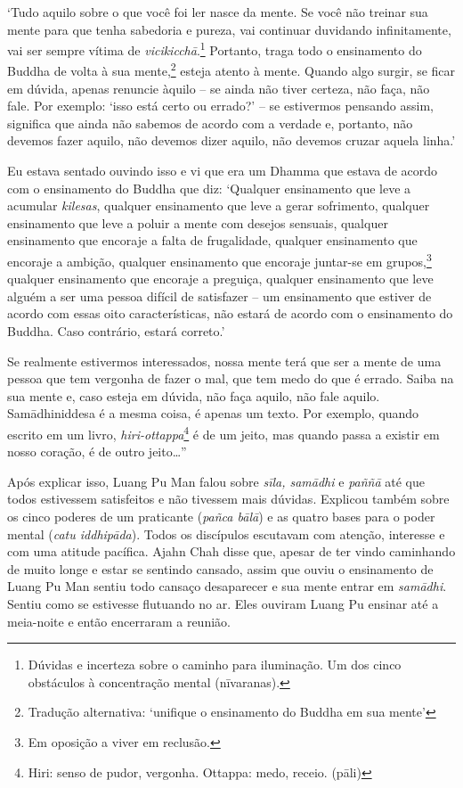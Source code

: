 `Tudo aquilo sobre o que você foi ler nasce da mente. Se você não
treinar sua mente para que tenha sabedoria e pureza, vai continuar
duvidando infinitamente, vai ser sempre vítima de
\emph{vicikicchā}.\footnote{Dúvidas e incerteza sobre o caminho para
  iluminação. Um dos cinco obstáculos à concentração mental (nīvaranas).}
Portanto, traga todo o ensinamento do Buddha de volta à sua
mente,\footnote{Tradução alternativa: `unifique o ensinamento do Buddha
  em sua mente'} esteja atento à mente. Quando algo surgir, se ficar em
dúvida, apenas renuncie àquilo -- se ainda não tiver certeza, não faça,
não fale. Por exemplo: `isso está certo ou errado?' -- se estivermos
pensando assim, significa que ainda não sabemos de acordo com a verdade
e, portanto, não devemos fazer aquilo, não devemos dizer aquilo, não
devemos cruzar aquela linha.'

Eu estava sentado ouvindo isso e vi que era um Dhamma que estava de
acordo com o ensinamento do Buddha que diz: `Qualquer ensinamento que
leve a acumular \emph{kilesas}, qualquer ensinamento que leve a gerar
sofrimento, qualquer ensinamento que leve a poluir a mente com desejos
sensuais, qualquer ensinamento que encoraje a falta de frugalidade,
qualquer ensinamento que encoraje a ambição, qualquer ensinamento que
encoraje juntar-se em grupos,\footnote{Em oposição a viver em reclusão.}
qualquer ensinamento que encoraje a preguiça, qualquer ensinamento que
leve alguém a ser uma pessoa difícil de satisfazer -- um ensinamento que
estiver de acordo com essas oito características, não estará de acordo
com o ensinamento do Buddha. Caso contrário, estará correto.'

Se realmente estivermos interessados, nossa mente terá que ser a mente
de uma pessoa que tem vergonha de fazer o mal, que tem medo do que é
errado. Saiba na sua mente e, caso esteja em dúvida, não faça aquilo,
não fale aquilo. Samādhiniddesa é a mesma coisa, é apenas um texto. Por
exemplo, quando escrito em um livro, \emph{hiri-ottappa}\footnote{Hiri:
  senso de pudor, vergonha. Ottappa: medo, receio. (pāli)} é de um
jeito, mas quando passa a existir em nosso coração, é de outro
jeito\ldots{}''

Após explicar isso, Luang Pu Man falou sobre \emph{sīla, samādhi} e
\emph{paññā} até que todos estivessem satisfeitos e não tivessem mais
dúvidas. Explicou também sobre os cinco poderes de um praticante
(\emph{pañca bālā}) e as quatro bases para o poder mental (\emph{catu
iddhipāda}). Todos os discípulos escutavam com atenção, interesse e com
uma atitude pacífica. Ajahn Chah disse que, apesar de ter vindo
caminhando de muito longe e estar se sentindo cansado, assim que ouviu o
ensinamento de Luang Pu Man sentiu todo cansaço desaparecer e sua mente
entrar em \emph{samādhi}. Sentiu como se estivesse flutuando no ar. Eles
ouviram Luang Pu ensinar até a meia-noite e então encerraram a reunião.

